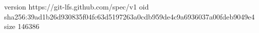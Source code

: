 version https://git-lfs.github.com/spec/v1
oid sha256:39ad1b26d930835f04fc63d5197263a0cdb959de4c9a6936037a00fdeb9049e4
size 146386
